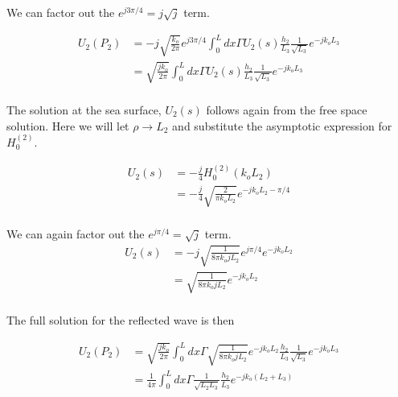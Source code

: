 \noindent We can factor out the  $e^{j3\pi /4} = j\sqrt{j}$ term.

\begin{equation}
\begin{aligned}
U_2(P_2) &= -j\sqrt{\frac{k_o}{2\pi}}e^{j3\pi /4}\int_0^L dx \Gamma U_2(s)\frac{h_2}{L_3}\frac{1}{\sqrt{L_3}}e^{-jk_oL_3} \\
&= \sqrt{\frac{j k_o}{2\pi}}\int_0^L dx \Gamma U_2(s)\frac{h_2}{L_3}\frac{1}{\sqrt{L_3}}e^{-jk_oL_3} \\
\label{cyl_eq:7ba}
\end{aligned}
\end{equation}
\renewcommand{\baselinestretch}{2} \small\normalsize

\noindent The solution at the sea surface, $U_2(s)$ follows again from the free space solution. Here we will let $\rho \rightarrow L_2$ and substitute the asymptotic expression for $H_0^{(2)}$.

 \begin{equation}
\begin{aligned}
U_2(s) &= -\frac{j}{4}H_0^{(2)}(k_o L_2) \\
&= -\frac{j}{4}\sqrt{\frac{2}{\pi k_o L_2}}e^{-jk_oL_2 -\pi/4}\\
\label{cyl_eq:7c}
\end{aligned}
\end{equation}
\renewcommand{\baselinestretch}{2} \small\normalsize

\noindent We can again factor out the $e^{j\pi/4} = \sqrt{j}$ term.
 \begin{equation}
\begin{aligned}
U_2(s) &= -j\sqrt{\frac{1}{8\pi k_oj L_2}}e^{j\pi/4}e^{-jk_oL_2} \\
&= \sqrt{\frac{1}{8 \pi k_o j L_2}}e^{-jk_oL_2} \\
\label{cyl_eq:7ca}
\end{aligned}
\end{equation}
\renewcommand{\baselinestretch}{2} \small\normalsize

\noindent The full solution for the reflected wave is then

\begin{equation}
\begin{aligned}
U_2(P_2) &= \sqrt{\frac{j k_o}{2\pi}}\int_0^L dx \Gamma \sqrt{\frac{1}{8 \pi k_o j L_2}}e^{-jk_oL_2}  \frac{h_2}{L_3}\frac{1}{\sqrt{L_3}}e^{-jk_oL_3} \\
&= \frac{1}{4\pi} \int_0^L dx \Gamma \frac{1}{\sqrt{L_2L_3}}\frac{h_2}{L_3} e^{-jk_o(L_2+L_3)}
\label{cyl_eq:7d}
\end{aligned}
\end{equation}
\renewcommand{\baselinestretch}{2} \small\normalsize


